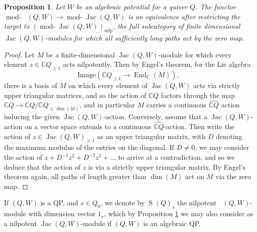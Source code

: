 \documentclass[a4paper,10pt]{amsart}
\newtheorem{proposition}[theorem]{Proposition}
\DeclareMathOperator{\Simp}{S}
\DeclareMathOperator{\nilp}{nilp}
\DeclareMathOperator{\End}{End}
\DeclareMathOperator{\tmod}{mod-}
\newcommand{\rmod}[1]{\tmod\!#1}
\DeclareMathOperator{\Jac}{Jac}
\DeclareMathOperator{\HJac}{\widehat{Jac}}
\begin{document}
\begin{proposition}
\label{EngelProp}
Let $W$ be an algebraic potential for a quiver $Q$.  The functor $\rmod{\HJac(Q,W)}\rightarrow \rmod{\Jac(Q,W)}$ is an equivalence after restricting the target to $(\rmod{\Jac(Q,W)})_{\nilp}$, the full subcategory of finite dimensional $\Jac(Q,W)$-modules for which all sufficiently long paths act by the zero map.  
\end{proposition}
\begin{proof}
Let $M$ be a finite-dimensional $\Jac(Q,W)$-module for which every element $z\in \mathbb{C}Q_{\geq 1}$ acts nilpotently.  Then by Engel's theorem, for the Lie algebra \[
\textrm{Image}\left(\mathbb{C}Q_{\geq 1}\rightarrow \End_{\mathbb{C}}(M)\right), 
\]
there is a basis of $M$ on which every element of $\Jac(Q,W)$ acts via strictly upper triangular matrices, and so the action of $\mathbb{C}Q$ factors through the map $\mathbb{C}Q\rightarrow \mathbb{C}Q/\mathbb{C}Q_{\geq \dim(M)}$, and in particular $M$ carries a continuous $\widehat{\mathbb{C}Q}$ action inducing the given $\Jac(Q,W)$-action.  Conversely, assume that a $\Jac(Q,W)$-action on a vector space extends to a continuous $\widehat{\mathbb{C}Q}$-action.  Then write the action of $z\in \Jac(Q,W)_{\geq 1}$ as an upper triangular matrix, with $D$ denoting the maximum modulus of the entries on the diagonal.  If $D\neq 0$, we may consider the action of $z+D^{-1}z^2+D^{-2}z^3+\ldots$ to arrive at a contradiction, and so we deduce that the action of $z$ is via a strictly upper triangular matrix.  By Engel's theorem again, all paths of length greater than $\dim(M)$ act on $M$ via the zero map.
\end{proof}


If $(Q,W)$ is a QP, and $s\in Q_0$, we denote by $\Simp(Q)_s$ the nilpotent $\HJac(Q,W)$-module with dimension vector $1_s$, which by Proposition \ref{EngelProp} we may also consider as a nilpotent $\Jac(Q,W)$-module if $(Q,W)$ is an algebraic QP.
\end{document}
